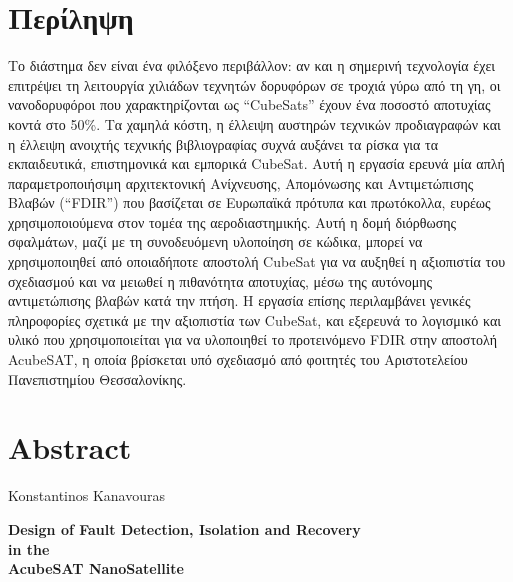 \documentclass[a4paper,nobib]{tufte-book}
\begin{document}
\cleardoublepage

\chapter*{Περίληψη}


\justify
Το διάστημα δεν είναι ένα φιλόξενο περιβάλλον: αν και η σημερινή τεχνολογία έχει επιτρέψει τη λειτουργία χιλιάδων τεχνητών δο\-ρυ\-φό\-ρων σε τροχιά γύρω από τη γη, οι νανοδορυφόροι που χαρακτηρίζονται ως “CubeSats” έχουν ένα ποσοστό αποτυχίας κοντά στο 50\%. Τα χαμηλά κόστη, η έλλειψη αυστηρών τεχνικών προδιαγραφών και η έλλειψη ανοιχτής τεχνικής βιβλιογραφίας συχνά αυξάνει τα ρίσκα για τα εκπαιδευτικά, επιστημονικά και εμπορικά CubeSat. Αυτή η εργασία ερευνά μία απλή παραμετροποιήσιμη αρχιτεκτονική Ανίχνευσης, Απομόνωσης και Αντιμετώπισης Βλαβών (“FDIR”) που βασίζεται σε Ευρωπαϊκά πρότυπα και πρωτόκολλα, ευρέως χρησιμοποιούμενα στον τομέα της αεροδιαστημικής. Αυτή η δομή διόρθωσης σφαλμάτων, μαζί με τη συνοδευόμενη υλοποίηση σε κώδικα, μπορεί να χρησιμοποιηθεί από οποιαδήποτε αποστολή CubeSat για να αυξηθεί η αξιοπιστία του σχεδιασμού και να μειωθεί η πιθανότητα αποτυχίας, μέσω της αυτόνομης αντιμετώπισης βλαβών κατά την πτήση. Η εργασία επίσης περιλαμβάνει γενικές πληροφορίες σχετικά με την αξιοπιστία των CubeSat, και εξερευνά το λογισμικό και υλικό που χρησιμοποιείται για να υλοποιηθεί το προτεινόμενο FDIR στην αποστολή AcubeSAT, η οποία βρίσκεται υπό σχεδιασμό από φοιτητές του Αριστοτελείου Πανεπιστημίου Θεσσαλονίκης.

\chapter*{Abstract}

\begin{center}
	\large Konstantinos Kanavouras
	\par
	\vspace{2ex}
	\Large\textbf{Design of Fault Detection, Isolation and Recovery}\\
	\large\textbf{in the}\\
	\Large\textbf{AcubeSAT NanoSatellite}\par
\end{center}
\end{document}
